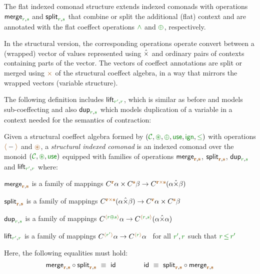 The flat indexed comonad structure extends indexed comonads with operations 
$\ident{merge}_{\cclrd{r},\cclrd{s}}$ and $\ident{split}_{\cclrd{r},\cclrd{s}}$ that combine or 
split the additional (flat) context and are annotated with the flat coeffect operations $\czip$ 
and $\cpar$, respectively. 

In the structural version, the corresponding operations operate convert between a (wrapped) vector 
of values represented using $\hat{\times}$ and ordinary pairs of contexts containing parts of the vector. 
The vectors of coeffect annotations are split or merged using $\atimes$ of the structural coeffect 
algebra, in a way that mirrors the wrapped vectors (variable structure).

The following definition includes $\ident{lift}_{\cclrd{r'},\cclrd{r}}$, which is similar as
before and models sub-coeffecting and also $\ident{dup}_{\cclrd{r}, \cclrd{s}}$ which models
duplication of a variable in a context needed for the semantics of contraction:

\begin{definition}
Given a structural coeffect algebra formed by $(\C, \cseq, \cpar, \cunit, \czero, \cleq)$
with operations $\alift{-}$ and $\aseq$, a \emph{structural indexed comonad} is an indexed comonad over 
the monoid $(\C, \cseq, \cunit)$ equipped with families of operations $\ident{merge}_{\aclrd{\textbf{r}},\aclrd{\textbf{s}}}$, 
$\ident{split}_{\aclrd{\textbf{r}},\aclrd{\textbf{s}}}$,
$\ident{dup}_{\cclrd{r}, \cclrd{s}}$ and $\ident{lift}_{\cclrd{r'},\cclrd{r}}$ where:
%
\begin{compactitem}
\item $\ident{merge}_{\aclrd{\textbf{r}},\aclrd{\textbf{s}}}$ is a family of mappings
  $\ctyp{\aclrd{\textbf{r}}}{\alpha} \times \ctyp{\aclrd{\textbf{s}}}{\beta} \rightarrow \ctyp{\aclrd{\textbf{r}}\atimes\aclrd{\textbf{s}}}{(\alpha \xtimes \beta)}$
\item $\ident{split}_{\aclrd{\textbf{r}},\aclrd{\textbf{s}}}$ is a family of mappings
  $\ctyp{\aclrd{\textbf{r}}\atimes\aclrd{\textbf{s}}}{(\alpha \xtimes \beta)} \rightarrow \ctyp{\aclrd{\textbf{r}}}{\alpha} \times \ctyp{\aclrd{\textbf{s}}}{\beta}$
\item $\ident{dup}_{\cclrd{r}, \cclrd{s}}$ is a family of mappings
  $\ctyp{\alift{\cclrd{r} \cpar \cclrd{s}}}{\alpha} \rightarrow \ctyp{\alift{\cclrd{r}, \cclrd{s}}}{(\alpha \xtimes \alpha)}$
\item $\ident{lift}_{\cclrd{r'},\cclrd{r}}$ is a family of mappings
  $\ctyp{\alift{\cclrd{r'}}}{\alpha} \rightarrow \ctyp{\alift{\cclrd{r}}}{\alpha}$~ for all $\cclrd{r'}, \cclrd{r}$ such that $\cclrd{r}\,\cleq\,\cclrd{r'}$
\end{compactitem}
%
Here, the following equalities must hold:
\begin{equation*}
\ident{merge}_{\aclrd{\textbf{r}},\aclrd{\textbf{s}}} \circ \ident{split}_{\aclrd{\textbf{r}},\aclrd{\textbf{s}}} ~\equiv~ \ident{id} \qquad\qquad
\ident{id} ~\equiv~ \ident{split}_{\aclrd{\textbf{r}},\aclrd{\textbf{s}}} \circ \ident{merge}_{\aclrd{\textbf{r}},\aclrd{\textbf{s}}} 
\end{equation*}

\end{definition}

